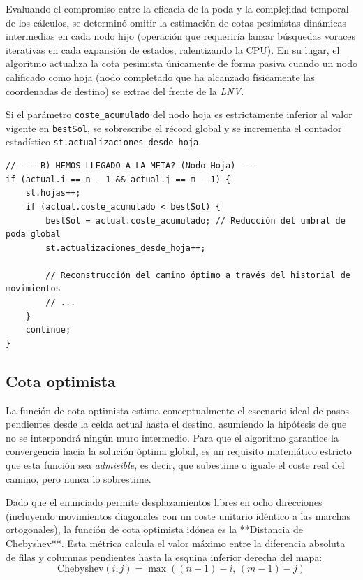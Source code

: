 \documentclass[11pt,a4paper]{article}
\begin{document}
Evaluando el compromiso entre la eficacia de la poda y la complejidad temporal de los cálculos, se determinó omitir la estimación de cotas pesimistas dinámicas intermedias en cada nodo hijo (operación que requeriría lanzar búsquedas voraces iterativas en cada expansión de estados, ralentizando la CPU). En su lugar, el algoritmo actualiza la cota pesimista únicamente de forma pasiva cuando un nodo calificado como hoja (nodo completado que ha alcanzado físicamente las coordenadas de destino) se extrae del frente de la \textit{LNV}.

Si el parámetro \texttt{coste\_acumulado} del nodo hoja es estrictamente inferior al valor vigente en \texttt{bestSol}, se sobrescribe el récord global y se incrementa el contador estadístico \texttt{st.actualizaciones\_desde\_hoja}.

\begin{lstlisting}[caption={Actualización de la cota pesimista global en nodos hoja}, label={lst:cota_resto}]
// --- B) HEMOS LLEGADO A LA META? (Nodo Hoja) ---
if (actual.i == n - 1 && actual.j == m - 1) {
    st.hojas++; 
    if (actual.coste_acumulado < bestSol) {
        bestSol = actual.coste_acumulado; // Reducción del umbral de poda global
        st.actualizaciones_desde_hoja++; 
        
        // Reconstrucción del camino óptimo a través del historial de movimientos
        // ...
    }
    continue; 
}
\end{lstlisting}

\subsection{Cota optimista}
La función de cota optimista estima conceptualmente el escenario ideal de pasos pendientes desde la celda actual hasta el destino, asumiendo la hipótesis de que no se interpondrá ningún muro intermedio. Para que el algoritmo garantice la convergencia hacia la solución óptima global, es un requisito matemático estricto que esta función sea \textit{admisible}, es decir, que subestime o iguale el coste real del camino, pero nunca lo sobrestime.

Dado que el enunciado permite desplazamientos libres en ocho direcciones (incluyendo movimientos diagonales con un coste unitario idéntico a las marchas ortogonales), la función de cota optimista idónea es la **Distancia de Chebyshev**. Esta métrica calcula el valor máximo entre la diferencia absoluta de filas y columnas pendientes hasta la esquina inferior derecha del mapa:
$$\text{Chebyshev}(i, j) = \max((n - 1) - i, \, (m - 1) - j)$$
\end{document}
